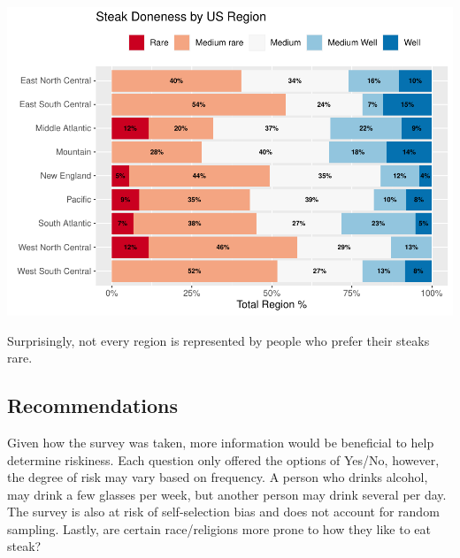 \documentclass[
]{article}
\begin{document}
\includegraphics{how_americans_like_their_steak_files/figure-latex/grouped-us_region-doneness-1.pdf}

Surprisingly, not every region is represented by people who prefer their
steaks rare.

\hypertarget{recommendations}{%
\subsection{Recommendations}\label{recommendations}}

Given how the survey was taken, more information would be beneficial to
help determine riskiness. Each question only offered the options of
Yes/No, however, the degree of risk may vary based on frequency. A
person who drinks alcohol, may drink a few glasses per week, but another
person may drink several per day. The survey is also at risk of
self-selection bias and does not account for random sampling. Lastly,
are certain race/religions more prone to how they like to eat steak?
\end{document}

